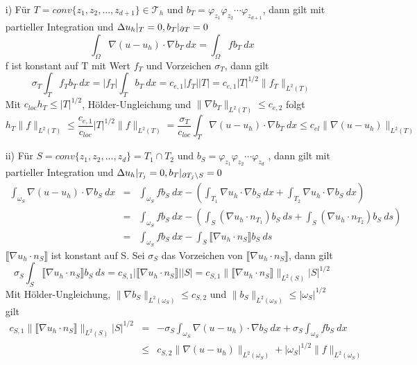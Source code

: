 \begin{itemize}
	\item[i)] 
	Für $T =conv\{z_1,z_2,...,z_{d+1}\} \in\mathscr{T}_h$ und $b_T = \varphi_{z_1}\varphi_{z_2}\cdots\varphi_{z_{d+1}}$, dann gilt mit partieller Integration und $\Delta u_h|_T = 0, b_T|_{\partial T} = 0$
	\[
	\int_{\Omega} \nabla (u - u_h) \cdot \nabla b_T\:dx =\int_{\Omega} f b_T \:dx
	\]
    f ist konstant auf T mit Wert $f_T$ und Vorzeichen $\sigma_T$, dann gilt
    \[
    \sigma_T\int_{T}f_Tb_T\:dx=|f_T|\int_{T}b_T\:dx=c_{e,1}|f_T||T|= c_{e,1}|T|^{1/2}\|f_T\|_{L^2(T)}
    \]
    Mit $c_{loc}h_T \leq |T|^{1/2}$, Hölder-Ungleichung und $\|\nabla b_T\|_{L^2(T)} \leq c_{e,2}$ folgt
    \[
    h_T\|f\|_{L^2(T)}\leq \frac{c_{e,1}}{c_{loc}} |T|^{1/2}\|f\|_{L^2(T)} =\frac{\sigma_T}{c_{loc}}\int_{T}\nabla (u - u_h) \cdot \nabla b_T\:dx \leq c_{el} \|\nabla (u-u_h)\|_{L^2(T)}
    \]
    \item[ii)]
    Für $S =conv\{z_1,z_2,...,z_{d}\} = T_1 \cap T_2$ und $b_S = \varphi_{z_1}\varphi_{z_2}\cdots\varphi_{z_{d}}$ , dann gilt mit partieller Integration und $\Delta u_h|_{T_j} = 0, b_T|_{\partial T_j\setminus S} = 0$
    \begin{eqnarray*}
    	\int_{\omega_S} \nabla (u-u_h)\cdot \nabla b_S \:dx &=& \int_{\omega_S} fb_S\:dx -\left(\int_{T_1} \nabla u_h\cdot \nabla b_S \:dx + \int_{T_2} \nabla u_h\cdot \nabla b_S \:dx\right) \\
    	&=& \int_{\omega_S} fb_S\:dx - \left(\int_{S} (\nabla u_h\cdot n_{T_1}) b_S \:ds + \int_{S} (\nabla u_h\cdot n_{T_2}) b_S \:ds\right)\\
    	&=& \int_{\omega_S} fb_S\:dx - \int_{S} \llbracket \nabla u_h \cdot n_S\rrbracket b_S\: ds
    \end{eqnarray*}
    $\llbracket \nabla u_h \cdot n_S\rrbracket$ ist konstant auf S. Sei $\sigma_S$ das Vorzeichen von $\llbracket \nabla u_h \cdot n_S\rrbracket$, dann gilt
    \[
    \sigma_S \int_{S} \llbracket \nabla u_h \cdot n_S\rrbracket b_S \:ds = c_{S,1}|\llbracket \nabla u_h \cdot n_S\rrbracket||S| =c_{S,1}\|\llbracket \nabla u_h \cdot n_S\rrbracket\|_{L^2(S)}|S|^{1/2}
    \] 
	Mit Hölder-Ungleichung, $\|\nabla b_S\|_{L^2(\omega_S)} \leq c_{S,2}$ und $\|b_S\|_{L^2(\omega_S)} \leq |\omega_S|^{1/2}$ gilt
	\begin{eqnarray*}
		c_{S,1}\|\llbracket \nabla u_h \cdot n_S\rrbracket\|_{L^2(S)}|S|^{1/2} &=& -\sigma_S\int_{\omega_S} \nabla (u-u_h)\cdot \nabla b_S\: dx +\sigma_S\int_{\omega_S} fb_S\:dx \\
		&\leq& c_{S,2} \|\nabla (u-u_h)\|_{L^2(\omega_S)} + |\omega_S|^{1/2}\|f\|_{L^2(\omega_S)}

\end{eqnarray*}
\end{itemize}
